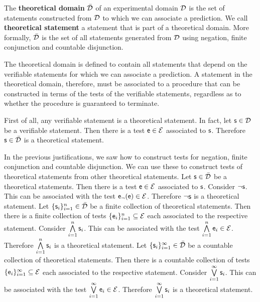 \documentclass[11pt,letterpaper,fleqn]{memoir} %
\begin{document}
\begin{mathSection}
\begin{defn}
	The \textbf{theoretical domain} $\bar{\mathcal{D}}$ of an experimental domain $\mathcal{D}$ is the set of statements constructed from $\mathcal{D}$ to which we can associate a prediction. We call \textbf{theoretical statement} a statement that is part of a theoretical domain. More formally, $\bar{\mathcal{D}}$ is the set of all statements generated from $\mathcal{D}$ using negation, finite conjunction and countable disjunction.
\end{defn}
\begin{justification}
	The theoretical domain is defined to contain all statements that depend on the verifiable statements for which we can associate a prediction. A statement in the theoretical domain, therefore, must be associated to a procedure that can be constructed in terms of the tests of the verifiable statements, regardless as to whether the procedure is guaranteed to terminate.
	
	First of all, any verifiable statement is a theoretical statement. In fact, let $\mathsf{s} \in \mathcal{D}$ be a verifiable statement. Then there is a test $\mathsf{e} \in \mathcal{E}$ associated to $\mathsf{s}$. Therefore $\mathsf{s} \in \bar{\mathcal{D}}$ is a theoretical statement.
	
	In the previous justifications, we saw how to construct tests for negation, finite conjunction and countable disjunction. We can use these to construct tests of theoretical statements from other theoretical statements. Let $\mathsf{s} \in \bar{\mathcal{D}}$ be a theoretical statements. Then there is a test $\mathsf{e} \in \mathcal{E}$ associated to $\mathsf{s}$. Consider $\neg\mathsf{s}$. This can be associated with the test $\mathsf{e}_\neg(\mathsf{e}) \in \mathcal{E}$. Therefore $\neg\mathsf{s}$ is a theoretical statement. Let $\{\mathsf{s}_i\}_{i=1}^{n} \in \bar{\mathcal{D}}$ be a finite collection of theoretical statements. Then there is a finite collection of tests $\{\mathsf{e}_i\}_{i=1}^{n} \subseteq \mathcal{E}$ each associated to the respective statement. Consider $\bigwedge\limits_{i=1}^{n} \mathsf{s}_i$. This can be associated with the test $\bigwedge\limits_{i=1}^{n} \mathsf{e}_i \in \mathcal{E}$. Therefore $\bigwedge\limits_{i=1}^{n} \mathsf{s}_i$ is a theoretical statement. Let $\{\mathsf{s}_i\}_{i=1}^{\infty} \in \bar{\mathcal{D}}$ be a countable collection of theoretical statements. Then there is a countable collection of tests $\{\mathsf{e}_i\}_{i=1}^{\infty} \subseteq \mathcal{E}$ each associated to the respective statement. Consider $\bigvee\limits_{i=1}^{\infty} \mathsf{s}_i$. This can be associated with the test $\bigvee\limits_{i=1}^{\infty} \mathsf{e}_i \in \mathcal{E}$. Therefore $\bigvee\limits_{i=1}^{\infty} \mathsf{s}_i$ is a theoretical statement.
	

\end{justification}
\end{mathSection}
\end{document}
